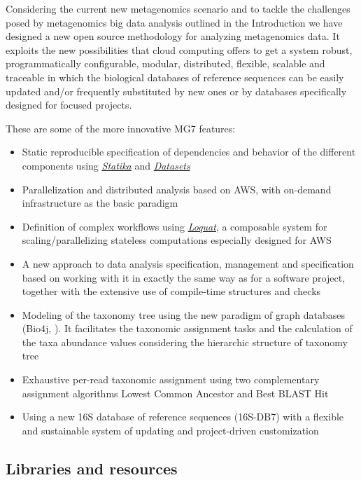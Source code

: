 \documentclass[fleqn,10pt,lineno]{wlpeerj}
\providecommand{\tightlist}{%
\setlength{\itemsep}{0pt}\setlength{\parskip}{0pt}}
\begin{document}
Considering the current new metagenomics scenario and to tackle the
challenges posed by metagenomics big data analysis outlined in the
Introduction we have designed a new open source methodology for
analyzing metagenomics data. It exploits the new possibilities that
cloud computing offers to get a system robust, programmatically
configurable, modular, distributed, flexible, scalable and traceable in
which the biological databases of reference sequences can be easily
updated and/or frequently substituted by new ones or by databases
specifically designed for focused projects.

These are some of the more innovative MG7 features:

\begin{itemize}
\tightlist
\item
  Static reproducible specification of dependencies and behavior of the
  different components using \emph{\protect\hyperlink{statika}{Statika}}
  and \emph{\protect\hyperlink{datasets}{Datasets}}
\item
  Parallelization and distributed analysis based on AWS, with on-demand
  infrastructure as the basic paradigm
\item
  Definition of complex workflows using
  \emph{\protect\hyperlink{loquat}{Loquat}}, a composable system for
  scaling/parallelizing stateless computations especially designed for
  AWS
\item
  A new approach to data analysis specification, management and
  specification based on working with it in exactly the same way as for
  a software project, together with the extensive use of compile-time
  structures and checks
\item
  Modeling of the taxonomy tree using the new paradigm of graph
  databases (Bio4j, \citep{pareja2015bio4j}). It facilitates the
  taxonomic assignment tasks and the calculation of the taxa abundance
  values considering the hierarchic structure of taxonomy tree
\item
  Exhaustive per-read taxonomic assignment using two complementary
  assignment algorithms Lowest Common Ancestor and Best BLAST Hit
\item
  Using a new 16S database of reference sequences (16S-DB7) with a
  flexible and sustainable system of updating and project-driven
  customization
\end{itemize}

\subsection{Libraries and resources}\label{libraries-and-resources}
\end{document}
